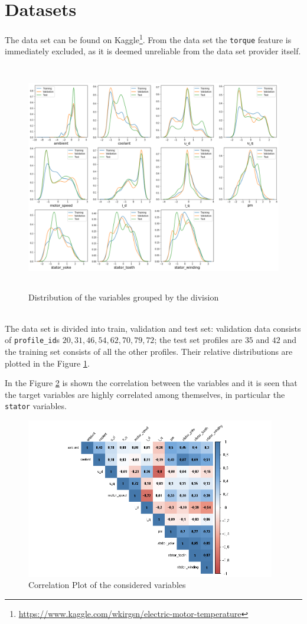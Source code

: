 \section{Datasets}
The data set can be found on Kaggle\footnote{\href{https://www.kaggle.com/wkirgsn/electric-motor-temperature}{https://www.kaggle.com/wkirgsn/electric-motor-temperature}}. From the data set the \verb|torque| feature is immediately excluded, as it is deemed unreliable from the data set provider itself.
\begin{figure}[!h]
    \centering
    \includegraphics[width=\linewidth, height=10cm]{imgs/dist_plot.png}
    \caption{Distribution of the variables grouped by the division}
    \label{fig:dist_plot}
\end{figure}\\
The data set is divided into train, validation and test set: validation data consists of \verb|profile_id|s $20, 31, 46, 54, 62, 70, 79, 72$; the test set profiles are $35$ and $42$ and the training set consists of all the other profiles. Their relative distributions are plotted in the Figure \ref{fig:dist_plot}.

In the Figure \ref{fig:corrplot} is shown the correlation between the variables and it is seen that the target variables are highly correlated among themselves, in particular the \verb|stator| variables.
\begin{figure}[!h]
    \centering
    \includegraphics[width=\linewidth, height=7cm]{imgs/corrplot.png}
    \caption{Correlation Plot of the considered variables}
    \label{fig:corrplot}
\end{figure}

